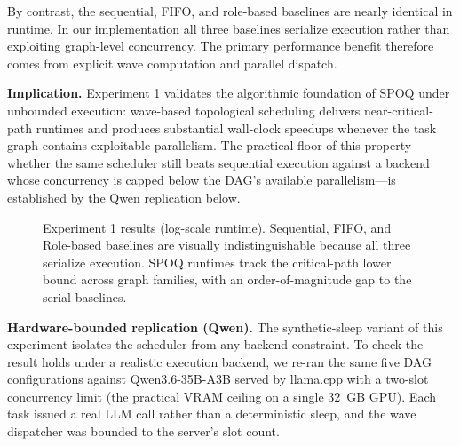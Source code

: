 By contrast, the sequential, FIFO, and role-based baselines are nearly identical in runtime. In our implementation all three baselines serialize execution rather than exploiting graph-level concurrency. The primary performance benefit therefore comes from explicit wave computation and parallel dispatch.

\textbf{Implication.}
Experiment 1 validates the algorithmic foundation of SPOQ under unbounded execution: wave-based topological scheduling delivers near-critical-path runtimes and produces substantial wall-clock speedups whenever the task graph contains exploitable parallelism. The practical floor of this property---whether the same scheduler still beats sequential execution against a backend whose concurrency is capped below the DAG's available parallelism---is established by the Qwen replication below.

\begin{figure}[t]
\centering
{}
\caption{Experiment 1 results (log-scale runtime). Sequential, FIFO, and Role-based baselines are visually indistinguishable because all three serialize execution. SPOQ runtimes track the critical-path lower bound across graph families, with an order-of-magnitude gap to the serial baselines.}
\label{fig:dag-runtime}
\end{figure}

\textbf{Hardware-bounded replication (Qwen).}
The synthetic-sleep variant of this experiment isolates the scheduler from any backend constraint. To check the result holds under a realistic execution backend, we re-ran the same five DAG configurations against Qwen3.6-35B-A3B served by llama.cpp with a two-slot concurrency limit (the practical VRAM ceiling on a single 32~GB GPU). Each task issued a real LLM call rather than a deterministic sleep, and the wave dispatcher was bounded to the server's slot count.

